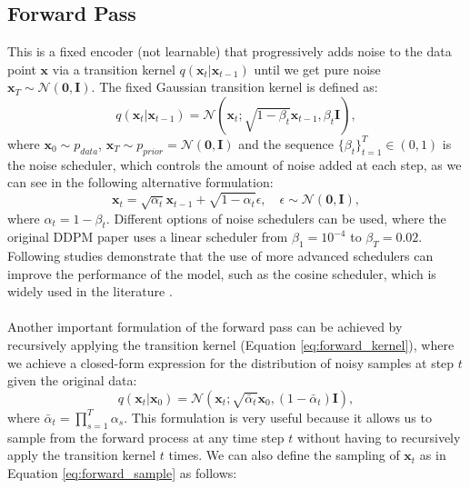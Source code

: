 \subsection{Forward Pass}
This is a fixed encoder (not learnable) that progressively adds noise to the data point $\mathbf{x}$ via a transition 
kernel $q(\mathbf{x}_t|\mathbf{x}_{t-1})$ until we get pure noise $\mathbf{x}_T \sim \mathcal{N}(\mathbf{0}, \mathbf{I})$. The fixed Gaussian transition kernel is defined as:
\begin{equation}\label{eq:forward_kernel}
    q(\mathbf{x}_t|\mathbf{x}_{t-1}) = \mathcal{N}(\mathbf{x}_t; \sqrt{1-\beta_t}\mathbf{x}_{t-1}, \beta_t\mathbf{I}),
\end{equation} 
where $\mathbf{x}_0\sim p_{data}$, $\mathbf{x}_T \sim p_{prior}=\mathcal{N}(\mathbf{0}, \mathbf{I})$ and the sequence $\{\beta_t\}_{t=1}^T\in(0,1)$ is the 
noise scheduler, which controls the amount of noise added at each step, as we can see in the following alternative formulation: 
\begin{equation}\label{eq:forward_sample}
    \mathbf{x}_t = \sqrt{\alpha_t} \mathbf{x}_{t-1} + \sqrt{1-\alpha_t} \epsilon, \quad \epsilon \sim \mathcal{N}(\mathbf{0}, \mathbf{I}),
\end{equation}
where $\alpha_t = 1-\beta_t$. Different options of noise schedulers can be used, where the original DDPM paper \cite{ho2020denoisingdiffusionprobabilisticmodels} uses a linear scheduler 
from $\beta_1 = 10^{-4}$ to $\beta_T=0.02$. Following studies demonstrate that the use of more advanced schedulers can improve the performance of the model, such as the cosine scheduler, 
which is widely used in the literature \cite{chen2023importancenoiseschedulingdiffusion,nichol2021improveddenoisingdiffusionprobabilistic}. \\
\\
Another important formulation of the forward pass can be achieved by recursively applying the transition kernel (Equation \ref{eq:forward_kernel}), 
where we achieve a closed-form expression for the distribution of noisy samples at step $t$ given the original data:
\begin{equation}
    q(\mathbf{x}_t|\mathbf{x}_0) = \mathcal{N}(\mathbf{x}_t; \sqrt{\bar{\alpha}_t}\mathbf{x}_0, (1-\bar{\alpha}_t)\mathbf{I}),
\end{equation}
where $\bar{\alpha}_t = \prod_{s=1}^T \alpha_s$. This formulation is very useful because it allows us to sample from the forward process at any 
time step $t$ without having to recursively apply the transition kernel $t$ times. We can also define the sampling of $\mathbf{x}_t$ as in Equation \ref{eq:forward_sample} as follows:

